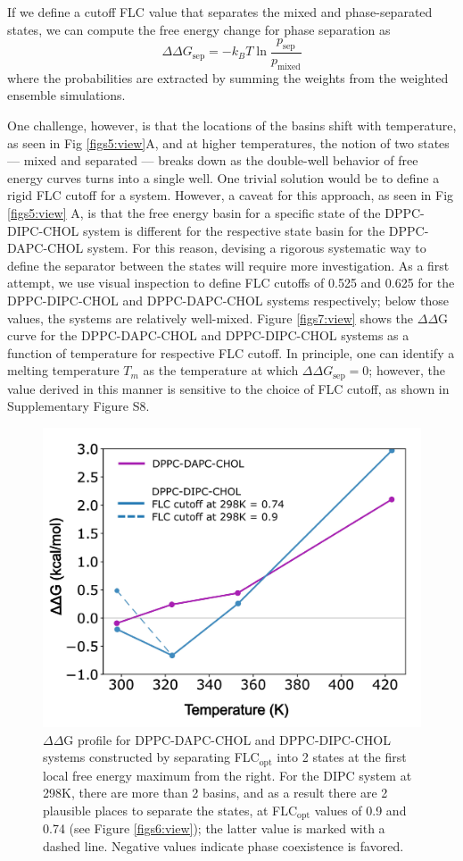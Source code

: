 \documentclass{biophys-new}
\begin{document}
If we define a cutoff FLC value that separates the mixed and phase-separated states, we can compute the free energy change for phase separation as
\begin{equation}
    \Delta \Delta G_{\text{sep}} = -k_B T \ln \frac{p_{\text{sep}}}{p_{\text{mixed}}}
    \label{eq:ddg}
\end{equation}
\noindent where the probabilities are extracted by summing the weights from the weighted ensemble simulations.

One challenge, however, is that the locations of the basins shift with temperature, as seen in Fig \ref{figs5:view}A, and
at higher temperatures, the notion of two states --- mixed and separated --- breaks down as the double-well behavior of free energy curves turns into a single well.
One trivial solution would be to define a rigid FLC cutoff for a system.
However, a caveat for this approach, as seen in Fig \ref{figs5:view} A, is that the free energy basin for a specific state of the DPPC-DIPC-CHOL system is different for the respective state basin for the DPPC-DAPC-CHOL system.
For this reason, devising a rigorous systematic way to define the separator between the states will require more investigation. As a first attempt, we use visual inspection to define FLC cutoffs of 0.525 and 0.625 for the DPPC-DIPC-CHOL and DPPC-DAPC-CHOL systems respectively; below those values, the systems are relatively well-mixed.
Figure \ref{figs7:view} shows the $\Delta\Delta$G curve for the DPPC-DAPC-CHOL and DPPC-DIPC-CHOL systems as a function of temperature for respective FLC cutoff. In principle, one can identify a melting temperature $T_m$ as the temperature at which $\Delta\Delta G_{\text{sep}}=0$; however, the value derived
in this manner is sensitive to the choice of FLC cutoff, as shown in Supplementary Figure S8.

\begin{figure}[hbt!]
    \centering
    \includegraphics[width=0.5\linewidth]{Figures/Main/8/placeholder.jpg}
    \caption{$\Delta\Delta$G profile for DPPC-DAPC-CHOL and DPPC-DIPC-CHOL systems constructed by separating FLC$_{\text{opt}}$ into 2 states at the first local free energy maximum from the right. For the DIPC system at 298K, there are more than 2 basins, and as a result there are 2 plausible places to separate the states, at FLC$_{\text{opt}}$ values of 0.9 and 0.74 (see Figure \ref{figs6:view}); the latter value is marked with a dashed line.  Negative values indicate phase coexistence is favored. 
    \label{newfig8}}
\end{figure}
\end{document}
